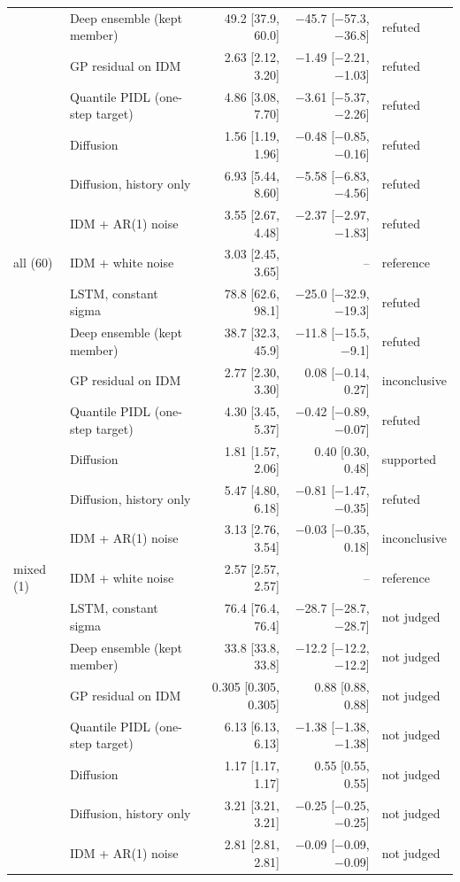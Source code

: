 \begin{table}[htbp]
\begin{tabular}{llrrl}
 & Deep ensemble (kept member) & 49.2 [37.9, 60.0] & $-$45.7 [$-$57.3, $-$36.8] & refuted \\
 & GP residual on IDM & 2.63 [2.12, 3.20] & $-$1.49 [$-$2.21, $-$1.03] & refuted \\
 & Quantile PIDL (one-step target) & 4.86 [3.08, 7.70] & $-$3.61 [$-$5.37, $-$2.26] & refuted \\
 & Diffusion & 1.56 [1.19, 1.96] & $-$0.48 [$-$0.85, $-$0.16] & refuted \\
 & Diffusion, history only & 6.93 [5.44, 8.60] & $-$5.58 [$-$6.83, $-$4.56] & refuted \\
 & IDM + AR(1) noise & 3.55 [2.67, 4.48] & $-$2.37 [$-$2.97, $-$1.83] & refuted \\
\midrule
all (60) & IDM + white noise & 3.03 [2.45, 3.65] & -- & reference \\
 & LSTM, constant sigma & 78.8 [62.6, 98.1] & $-$25.0 [$-$32.9, $-$19.3] & refuted \\
 & Deep ensemble (kept member) & 38.7 [32.3, 45.9] & $-$11.8 [$-$15.5, $-$9.1] & refuted \\
 & GP residual on IDM & 2.77 [2.30, 3.30] & 0.08 [$-$0.14, 0.27] & inconclusive \\
 & Quantile PIDL (one-step target) & 4.30 [3.45, 5.37] & $-$0.42 [$-$0.89, $-$0.07] & refuted \\
 & Diffusion & 1.81 [1.57, 2.06] & 0.40 [0.30, 0.48] & supported \\
 & Diffusion, history only & 5.47 [4.80, 6.18] & $-$0.81 [$-$1.47, $-$0.35] & refuted \\
 & IDM + AR(1) noise & 3.13 [2.76, 3.54] & $-$0.03 [$-$0.35, 0.18] & inconclusive \\
\midrule
mixed (1) & IDM + white noise & 2.57 [2.57, 2.57] & -- & reference \\
 & LSTM, constant sigma & 76.4 [76.4, 76.4] & $-$28.7 [$-$28.7, $-$28.7] & not judged \\
 & Deep ensemble (kept member) & 33.8 [33.8, 33.8] & $-$12.2 [$-$12.2, $-$12.2] & not judged \\
 & GP residual on IDM & 0.305 [0.305, 0.305] & 0.88 [0.88, 0.88] & not judged \\
 & Quantile PIDL (one-step target) & 6.13 [6.13, 6.13] & $-$1.38 [$-$1.38, $-$1.38] & not judged \\
 & Diffusion & 1.17 [1.17, 1.17] & 0.55 [0.55, 0.55] & not judged \\
 & Diffusion, history only & 3.21 [3.21, 3.21] & $-$0.25 [$-$0.25, $-$0.25] & not judged \\
 & IDM + AR(1) noise & 2.81 [2.81, 2.81] & $-$0.09 [$-$0.09, $-$0.09] & not judged \\
\bottomrule
\end{tabular}
\end{table}
